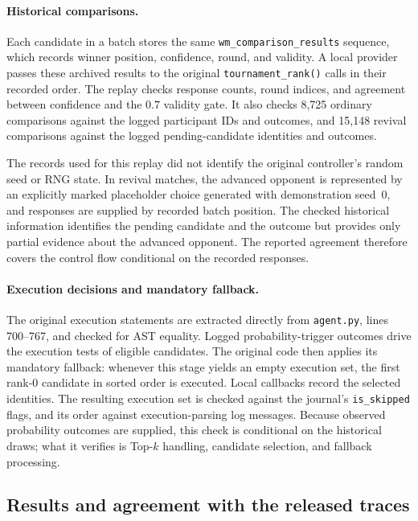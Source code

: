 \paragraph{Historical comparisons.}
Each candidate in a batch stores the same \texttt{wm\_comparison\_results} sequence, which records winner position, confidence, round, and validity. A local provider passes these archived results to the original \texttt{tournament\_rank()} calls in their recorded order. The replay checks response counts, round indices, and agreement between confidence and the $0.7$ validity gate. It also checks 8,725 ordinary comparisons against the logged participant IDs and outcomes, and 15,148 revival comparisons against the logged pending-candidate identities and outcomes.

The records used for this replay did not identify the original controller's random seed or RNG state. In revival matches, the advanced opponent is represented by an explicitly marked placeholder choice generated with demonstration seed~0, and responses are supplied by recorded batch position. The checked historical information identifies the pending candidate and the outcome but provides only partial evidence about the advanced opponent. The reported agreement therefore covers the control flow conditional on the recorded responses.

\paragraph{Execution decisions and mandatory fallback.}
The original execution statements are extracted directly from \texttt{agent.py}, lines 700--767, and checked for AST equality. Logged probability-trigger outcomes drive the execution tests of eligible candidates. The original code then applies its mandatory fallback: whenever this stage yields an empty execution set, the first rank-0 candidate in sorted order is executed. Local callbacks record the selected identities. The resulting execution set is checked against the journal's \texttt{is\_skipped} flags, and its order against execution-parsing log messages. Because observed probability outcomes are supplied, this check is conditional on the historical draws; what it verifies is Top-$k$ handling, candidate selection, and fallback processing.

\subsection{Results and agreement with the released traces}

